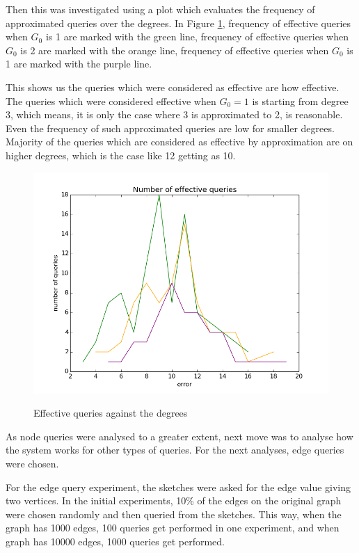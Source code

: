 \documentclass[12pt]{report}
\numberwithin{figure}{section}
\numberwithin{table}{section}
\begin{document}
Then this was investigated using a plot which evaluates the frequency of approximated queries over the degrees. In Figure \ref{fig:effective-queries-against-degree}, frequency of effective queries when $G_0$ is 1 are marked with the green line, frequency of effective queries when $G_0$ is 2 are marked with the orange line, frequency of effective queries when $G_0$ is 1 are marked with the purple line. 

This shows us the queries which were considered as effective are how effective. The queries which were considered effective when $G_0 = 1$ is starting from degree 3, which means, it is only the case where 3 is approximated to 2, is reasonable. Even the frequency of such approximated queries are low for smaller degrees. Majority of the queries which are considered as effective by approximation are on higher degrees, which is the case like 12 getting as 10.

\begin{figure}[H]
\centering
\includegraphics[scale=0.6]{images/deviation-plot-error-AS-2init-2scale-0t-n1000-e10000-sketches-811-821-823-827-829plot}
\label{fig:effective-queries-against-degree}
\caption{ Effective queries against the degrees }
\end{figure}

As node queries were analysed to a greater extent, next move was to analyse how the system works for other types of queries. For the next analyses, edge queries were chosen.

For the edge query experiment, the sketches were asked for the edge value giving two vertices. In the initial experiments, 10\% of the edges on the original graph were chosen randomly and then queried from the sketches. This way, when the graph has 1000 edges, 100 queries get performed in one experiment, and when graph has 10000 edges, 1000 queries get performed.
\end{document}
